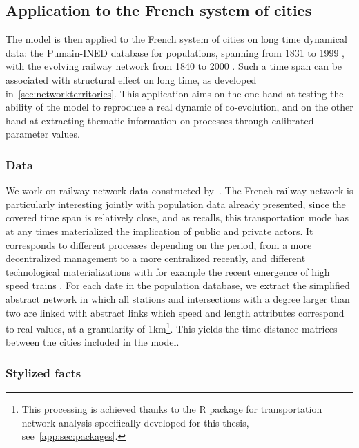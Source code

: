 \subsection{Application to the French system of cities}


The model is then applied to the French system of cities on long time dynamical data: the Pumain-INED database for populations, spanning from 1831 to 1999 \cite{pumain1986fichier}, with the evolving railway network from 1840 to 2000 \cite{thevenin2013mapping}. Such a time span can be associated with structural effect on long time, as developed in~\ref{sec:networkterritories}. This application aims on the one hand at testing the ability of the model to reproduce a real dynamic of co-evolution, and on the other hand at extracting thematic information on processes through calibrated parameter values.

\subsubsection{Data}

We work on railway network data constructed by~\cite{thevenin2013mapping}. The French railway network is particularly interesting jointly with population data already presented, since the covered time span is relatively close, and as \cite{thevenin2013mapping} recalls, this transportation mode has at any times materialized the implication of public and private actors. It corresponds to different processes depending on the period, from a more decentralized management to a more centralized recently, and different technological materializations with for example the recent emergence of high speed trains \cite{zembri1997fondements}. For each date in the population database, we extract the simplified abstract network in which all stations and intersections with a degree larger than two are linked with abstract links which speed and length attributes correspond to real values, at a granularity of 1km\footnote{This processing is achieved thanks to the R package for transportation network analysis specifically developed for this thesis, see~\ref{app:sec:packages}.}. This yields the time-distance matrices between the cities included in the model.



\subsubsection{Stylized facts}


